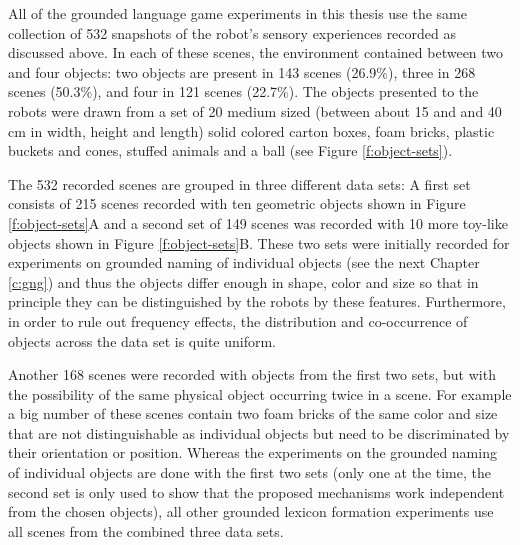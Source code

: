 All of the grounded language game experiments in this thesis use the
same collection of 532 snapshots of the robot's sensory experiences
recorded as discussed above. In each of these scenes, the environment
contained between two and four objects: two objects are present in 143
scenes (26.9\%), three in 268 scenes (50.3\%), and four in 121 scenes
(22.7\%). The objects presented to the robots were drawn from a set of
20 medium sized (between about 15 and and 40 cm in width, height and
length) solid colored carton boxes, foam bricks, plastic buckets and
cones, stuffed animals and a ball (see Figure \ref{f:object-sets}).

The 532 recorded scenes are grouped in three different data sets: A
first set consists of 215 scenes recorded with ten geometric objects
shown in Figure \ref{f:object-sets}A and a second set of 149 scenes
was recorded with 10 more toy-like objects shown in Figure
\ref{f:object-sets}B. These two sets were initially recorded for
experiments on grounded naming of individual objects (see the next
Chapter \ref{c:gng}) and thus the objects differ enough in shape,
color and size so that in principle they can be distinguished by the
robots by these features. Furthermore, in order to rule out frequency
effects, the distribution and co-occurrence of objects across the data
set is quite uniform.

Another 168 scenes were recorded with objects from the first two sets,
but with the possibility of the same physical object occurring twice
in a scene. For example a big number of these scenes contain two foam
bricks of the same color and size that are not distinguishable as
individual objects but need to be discriminated by their orientation
or position. Whereas the experiments on the grounded naming of
individual objects are done with the first two sets (only one at the
time, the second set is only used to show that the proposed mechanisms
work independent from the chosen objects), all other grounded lexicon
formation experiments use all scenes from the combined three data
sets.



